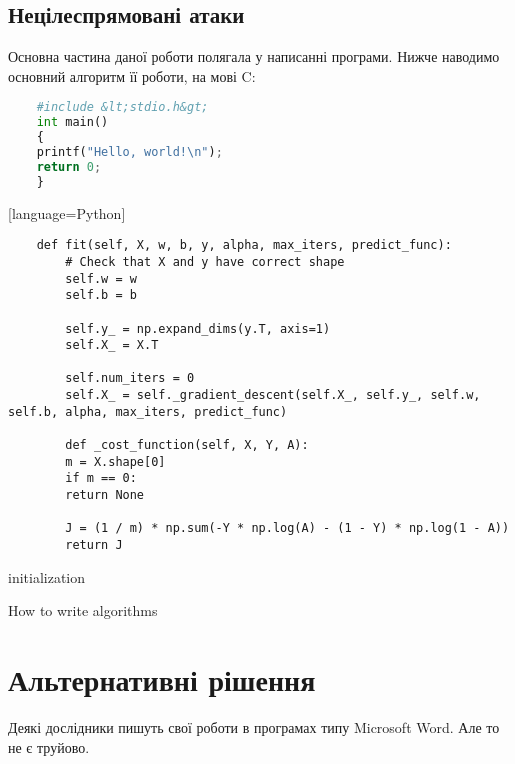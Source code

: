 \documentclass[a4paper,14pt]{extreport}
\begin{document}
	
	\section{Нецілеспрямовані атаки} 
	Основна частина даної роботи полягала у написанні програми. Нижче наводимо основний алгоритм її роботи, на мові C:
	
	\begin{lstlisting}[language=Python]
	% ============================================ %
	#include &lt;stdio.h&gt;
	int main() 
	{ 
	printf("Hello, world!\n"); 
	return 0; 
	} 
	\end{lstlisting}[language=Python]

	\lstset{language=Python}
	\begin{lstlisting}
	def fit(self, X, w, b, y, alpha, max_iters, predict_func):
		# Check that X and y have correct shape
		self.w = w
		self.b = b
		
		self.y_ = np.expand_dims(y.T, axis=1)
		self.X_ = X.T
		
		self.num_iters = 0
		self.X_ = self._gradient_descent(self.X_, self.y_, self.w, self.b, alpha, max_iters, predict_func)
		
		def _cost_function(self, X, Y, A):
		m = X.shape[0]
		if m == 0:
		return None
		
		J = (1 / m) * np.sum(-Y * np.log(A) - (1 - Y) * np.log(1 - A))
		return J
	\end{lstlisting}
	
	\begin{algorithm}[H]
		\SetAlgoLined
		initialization\;
		\caption{How to write algorithms}
	\end{algorithm}
	
	
	
	\chapter{Альтернативні рішення} 
	Деякі дослідники пишуть свої роботи в програмах типу Microsoft Word. Але то не є труйово\cite{howto}.
	
\end{document}
